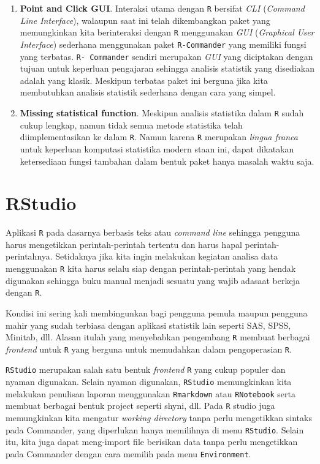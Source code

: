 \documentclass[]{book}
\providecommand{\tightlist}{%
  \setlength{\itemsep}{0pt}\setlength{\parskip}{0pt}}
\theoremstyle{definition}
\theoremstyle{definition}
\theoremstyle{definition}
\theoremstyle{remark}
\begin{document}
\begin{enumerate}
\def\labelenumi{\arabic{enumi}.}
\tightlist
\item
  \textbf{Point and Click GUI}. Interaksi utama dengan \texttt{R} bersifat \emph{CLI} (\emph{Command Line Interface}), walaupun saat ini telah dikembangkan paket yang memungkinkan kita berinteraksi dengan \texttt{R} menggunakan \emph{GUI} (\emph{Graphical User Interface}) sederhana menggunakan paket \texttt{R-Commander} yang memiliki fungsi yang terbatas. \texttt{R-\ Commander} sendiri merupakan \emph{GUI} yang diciptakan dengan tujuan untuk keperluan pengajaran sehingga analisis statistik yang disediakan adalah yang klasik. Meskipun terbatas paket ini berguna jika kita membutuhkan analisis statistik sederhana dengan cara yang simpel.
\item
  \textbf{Missing statistical function}. Meskipun analisis statistika dalam \texttt{R} sudah cukup lengkap, namun tidak semua metode statistika telah diimplementasikan ke dalam \texttt{R}. Namun karena \texttt{R} merupakan \emph{lingua franca} untuk keperluan komputasi statistika modern staan ini, dapat dikatakan ketersediaan fungsi tambahan dalam bentuk paket hanya masalah waktu saja.
\end{enumerate}

\hypertarget{rstudio}{%
\section{RStudio}\label{rstudio}}

Aplikasi \texttt{R} pada dasarnya berbasis teks atau \emph{command line} sehingga pengguna harus mengetikkan perintah-perintah tertentu dan harus hapal perintah-perintahnya. Setidaknya jika kita ingin melakukan kegiatan analisa data menggunakan \texttt{R} kita harus selalu siap dengan perintah-perintah yang hendak digunakan sehingga buku manual menjadi sesuatu yang wajib adasaat berkeja dengan \texttt{R}.

Kondisi ini sering kali membingunkan bagi pengguna pemula maupun pengguna mahir yang sudah terbiasa dengan aplikasi statistik lain seperti SAS, SPSS, Minitab, dll. Alasan itulah yang menyebabkan pengembang \texttt{R} membuat berbagai \emph{frontend} untuk \texttt{R} yang berguna untuk memudahkan dalam pengoperasian \texttt{R}.

\texttt{RStudio} merupakan salah satu bentuk \emph{frontend} \texttt{R} yang cukup populer dan nyaman digunakan. Selain nyaman digunakan, \texttt{RStudio} memungkinkan kita melakukan penulisan laporan menggunakan \texttt{Rmarkdown} atau \texttt{RNotebook} serta membuat berbagai bentuk project seperti shyni, dll. Pada \texttt{R} studio juga memungkinkan kita mengatur \emph{working directory} tanpa perlu mengetikkan sintaks pada Commander, yang diperlukan hanya memilihnya di menu \texttt{RStudio}. Selain itu, kita juga dapat meng-import file berisikan data tanpa perlu mengetikkan pada Commander dengan cara memilih pada menu \texttt{Environment}.
\end{document}
